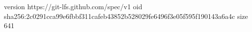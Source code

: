 version https://git-lfs.github.com/spec/v1
oid sha256:2c0291cca99e6fbbf311cafeb43852b528029fe6496f3e05f595f190143a6a4c
size 641
